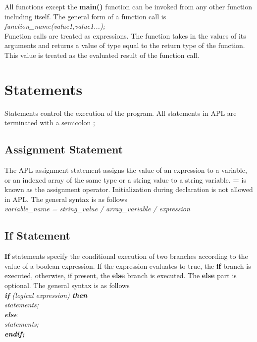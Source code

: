 \documentclass[11pt]{article}
\begin{document}
All functions except the \textbf{main()} function can be invoked from any other function including itself. The general form of a function call is \\

\textit{function\_name(value1,value1...);}
\\

Function calls are treated as expressions. The function takes in the values of its arguments and returns a value of type equal to the return type of the function. This value is treated as the evaluated result of the function call.




\section{Statements}

Statements control the execution of the program. All statements in APL are terminated with a semicolon ;





\subsection{Assignment Statement}
The APL assignment statement assigns the value of an expression to a variable, or an indexed array of the same type or a string value to a string variable. \textbf{=} is known as the assignment operator. Initialization during declaration is not allowed in APL. The general syntax is as follows\\
\textit{ variable\_name = string\_value / array\_variable / expression }






\subsection{If Statement}
\textbf{If} statements specify the conditional execution of two branches according to the value of a boolean expression. If the expression evaluates to true, the \textbf{if} branch is executed, otherwise, if present, the \textbf{else}  branch is executed. The \textbf{else} part is optional. The general syntax is as follows  \\

\textit{
\textbf{if} (logical expression) \textbf{then}  \\
 \indent \indent statements; \\
\indent \textbf{else} \\
\indent  \indent statements; \\
\indent \textbf{endif;}  \\
}
\end{document}
